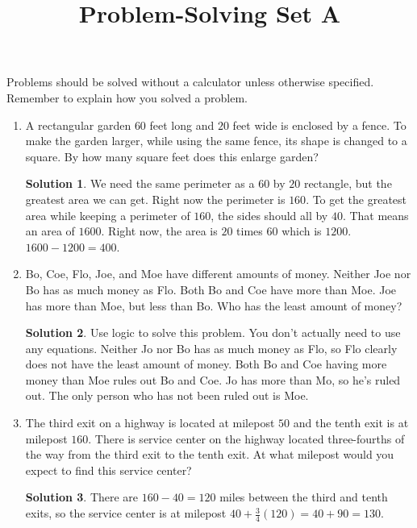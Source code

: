 \documentclass{article}
\title{Problem-Solving Set A}
\author{}
\date{}
\theoremstyle{definition}
\newtheorem*{solution}{Solution}
\begin{document}
\maketitle
\noindent Problems should be solved without a calculator unless otherwise specified.
Remember to explain how you solved a problem.
\begin{multicols}{2}
    \begin{enumerate}
        \item A rectangular garden $60$ feet long and $20$ feet wide is enclosed by a fence.
            To make the garden larger, while using the same fence, its shape is changed to a square.
            By how many square feet does this enlarge garden?
            \begin{solution}
                We need the same perimeter as a $60$ by $20$ rectangle, but the greatest area we can get.
                Right now the perimeter is $160$.
                To get the greatest area while keeping a perimeter of $160$, the sides should all by $40$.
                That means an area of $1600$.
                Right now, the area is $20$ times $60$ which is $1200$.
                $1600 - 1200 = 400$.
            \end{solution}
        \item Bo, Coe, Flo, Joe, and Moe have different amounts of money.
            Neither Joe nor Bo has as much money as Flo.
            Both Bo and Coe have more than Moe.
            Joe has more than Moe, but less than Bo.
            Who has the least amount of money?
            \begin{solution}
                Use logic to solve this problem.
                You don't actually need to use any equations.
                Neither Jo nor Bo has as much money as Flo, so Flo clearly does not have the least amount of money.
                Both Bo and Coe having more money than Moe rules out Bo and Coe.
                Jo has more than Mo, so he's ruled out.
                The only person who has not been ruled out is Moe.
            \end{solution}
        \item The third exit on a highway is located at milepost $50$ and the tenth exit is at milepost $160$.
            There is service center on the highway located three-fourths of the way from the third exit to the tenth exit.
            At what milepost would you expect to find this service center?
            \begin{solution}
                There are $160 - 40 = 120$ miles between the third and tenth exits, so the service center is at milepost $40 + \frac{3}{4} (120) = 40 + 90 = 130$.

\end{solution}
\end{enumerate}
\end{multicols}
\end{document}
